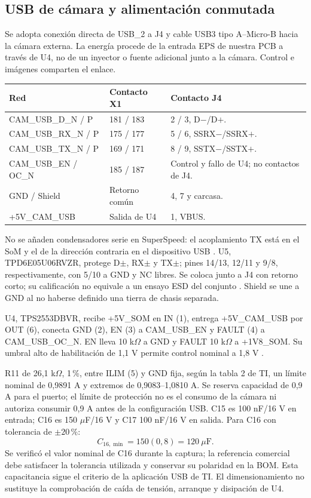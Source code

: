 \documentclass[11pt,letterpaper]{article}
\begin{document}
\subsection{USB de cámara y alimentación conmutada}
Se adopta conexión directa de USB\_2 a J4 y cable USB3 tipo A--Micro-B hacia la cámara externa. La energía procede de la entrada EPS de nuestra PCB a través de U4, no de un inyector o fuente adicional junto a la cámara. Control e imágenes comparten el enlace.
\begin{tabularx}{\textwidth}{L{2.7cm}L{2.4cm}X}
\toprule Red & Contacto X1 & Contacto J4 \\
\midrule
CAM\_USB\_D\_N / P & 181 / 183 & 2 / 3, D$-$/D$+$. \\
CAM\_USB\_RX\_N / P & 175 / 177 & 5 / 6, SSRX$-$/SSRX$+$. \\
CAM\_USB\_TX\_N / P & 169 / 171 & 8 / 9, SSTX$-$/SSTX$+$. \\
CAM\_USB\_EN / OC\_N & 185 / 187 & Control y fallo de U4; no contactos de J4. \\
GND / Shield & Retorno común & 4, 7 y carcasa. \\
+5V\_CAM\_USB & Salida de U4 & 1, VBUS. \\
\bottomrule
\end{tabularx}
No se añaden condensadores serie en SuperSpeed: el acoplamiento TX está en el SoM y el de la dirección contraria en el dispositivo USB \cite{verdinguide}. U5, TPD6E05U06RVZR, protege D$\pm$, RX$\pm$ y TX$\pm$; pines 14/13, 12/11 y 9/8, respectivamente, con 5/10 a GND y NC libres. Se coloca junto a J4 con retorno corto; su calificación no equivale a un ensayo ESD del conjunto \cite{tpd6e05}. Shield se une a GND al no haberse definido una tierra de chasis separada.

U4, TPS2553DBVR, recibe +5V\_SOM en IN (1), entrega +5V\_CAM\_USB por OUT (6), conecta GND (2), EN (3) a CAM\_USB\_EN y FAULT (4) a CAM\_USB\_OC\_N. EN lleva 10 k$\Omega$ a GND y FAULT 10 k$\Omega$ a +1V8\_SOM. Su umbral alto de habilitación de 1,1 V permite control nominal a 1,8 V \cite{tps2553}.

R11 de 26,1 k$\Omega$, 1\,\%, entre ILIM (5) y GND fija, según la tabla 2 de TI, un límite nominal de 0,9891 A y extremos de 0,9083--1,0810 A. Se reserva capacidad de 0,9 A para el puerto; el límite de protección no es el consumo de la cámara ni autoriza consumir 0,9 A antes de la configuración USB. C15 es 100 nF/16 V en entrada; C16 es 150 $\mu$F/16 V y C17 100 nF/16 V en salida. Para C16 con tolerancia de $\pm20\,\%$:
\begin{equation}
C_{16,\min}=150(0,8)=120\ \mu\mathrm{F}.
\end{equation}
Se verificó el valor nominal de C16 durante la captura; la referencia comercial debe satisfacer la tolerancia utilizada y conservar su polaridad en la BOM. Esta capacitancia sigue el criterio de la aplicación USB de TI. El dimensionamiento no sustituye la comprobación de caída de tensión, arranque y disipación de U4.
\end{document}
